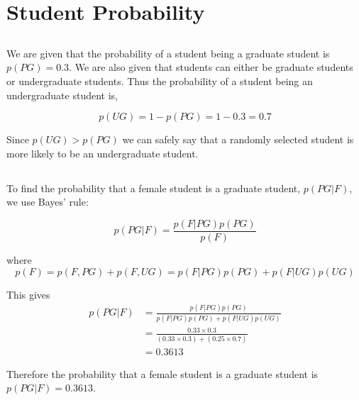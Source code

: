 \documentclass{article}
\begin{document}
\newpage

\section{Student Probability}
\subsection{}
We are given that the probability of a student being a graduate student is $p(PG) = 0.3$. We are also given that students can either be graduate students or undergraduate students. Thus the probability of a student being an undergraduate student is,

\begin{equation}
p(UG) = 1 - p(PG) = 1 - 0.3 = 0.7
\end{equation}

Since $p(UG) > p(PG)$ we can safely say that a randomly selected student is more likely to be an undergraduate student.

\subsection{}
To find the probability that a female student is a graduate student, $p(PG|F)$, we use Bayes' rule:

\begin{equation}
p(PG|F) = \frac{p(F|PG)p(PG)}{p(F)}
\end{equation}

where
\begin{equation}
p(F) = p(F,PG)+p(F,UG) = p(F|PG)p(PG)+p(F|UG)p(UG)
\end{equation}

This gives
\begin{align}
p(PG|F) &= \frac{p(F|PG)p(PG)}{p(F|PG)p(PG)+p(F|UG)p(UG)}\\
&=\frac{0.33\times0.3}{(0.33\times0.3)+(0.25\times0.7)}\\
&=0.3613
\end{align}

Therefore the probability that a female student is a graduate student is $p(PG|F) = 0.3613$.

\subsection{}
\end{document}
